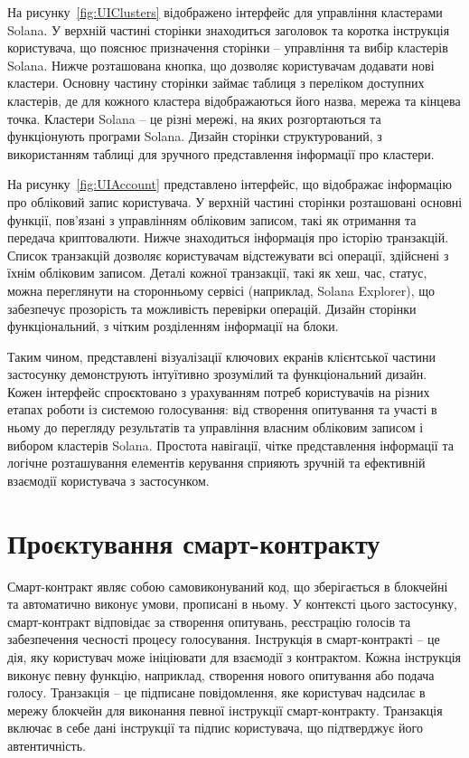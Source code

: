 \documentclass[14pt]{extreport}
\begin{document}
  На рисунку~\ref{fig:UIClusters} відображено інтерфейс для управління кластерами Solana. У верхній частині сторінки знаходиться заголовок та коротка інструкція користувача, що пояснює призначення сторінки – управління та вибір кластерів Solana. Нижче розташована кнопка, що дозволяє користувачам додавати нові кластери. Основну частину сторінки займає таблиця з переліком доступних кластерів, де для кожного кластера відображаються його назва, мережа та кінцева точка. Кластери Solana – це різні мережі, на яких розгортаються та функціонують програми Solana. Дизайн сторінки структурований, з використанням таблиці для зручного представлення інформації про кластери.

  На рисунку~\ref{fig:UIAccount} представлено інтерфейс, що відображає інформацію про обліковий запис користувача. У верхній частині сторінки розташовані основні функції, пов'язані з управлінням обліковим записом, такі як отримання та передача криптовалюти. Нижче знаходиться інформація про історію транзакцій. Список транзакцій дозволяє користувачам відстежувати всі операції, здійснені з їхнім обліковим записом. Деталі кожної транзакції, такі як хеш, час, статус, можна переглянути на сторонньому сервісі (наприклад, Solana Explorer), що забезпечує прозорість та можливість перевірки операцій. Дизайн сторінки функціональний, з чітким розділенням інформації на блоки.
    
  Таким чином, представлені візуалізації ключових екранів клієнтської частини застосунку демонструють інтуїтивно зрозумілий та функціональний дизайн. Кожен інтерфейс спроєктовано з урахуванням потреб користувачів на різних етапах роботи із системою голосування: від створення опитування та участі в ньому до перегляду результатів та управління власним обліковим записом і вибором кластерів Solana. Простота навігації, чітке представлення інформації та логічне розташування елементів керування сприяють зручній та ефективній взаємодії користувача з застосунком.
  
  \section{Проєктування смарт-контракту}
  
  Смарт-контракт являє собою самовиконуваний код, що зберігається в блокчейні та автоматично виконує умови, прописані в ньому. У контексті цього застосунку, смарт-контракт відповідає за створення опитувань, реєстрацію голосів та забезпечення чесності процесу голосування. Інструкція в смарт-контракті – це дія, яку користувач може ініціювати для взаємодії з контрактом. Кожна інструкція виконує певну функцію, наприклад, створення нового опитування або подача голосу. Транзакція – це підписане повідомлення, яке користувач надсилає в мережу блокчейн для виконання певної інструкції смарт-контракту. Транзакція включає в себе дані інструкції та підпис користувача, що підтверджує його автентичність.
  
\end{document}
